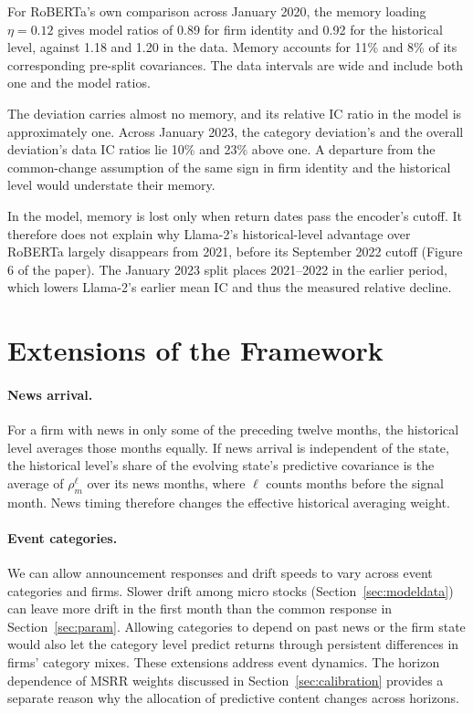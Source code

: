 \documentclass[11pt,letterpaper]{article}
\theoremstyle{remark}
\begin{document}
For RoBERTa's own comparison across January 2020, the memory loading $\eta=0.12$ gives model ratios of 0.89 for firm identity and 0.92 for the historical level, against 1.18 and 1.20 in the data. Memory accounts for 11\% and 8\% of its corresponding pre-split covariances. The data intervals are wide and include both one and the model ratios.

The deviation carries almost no memory, and its relative IC ratio in the model is approximately one. Across January 2023, the category deviation's and the overall deviation's data IC ratios lie 10\% and 23\% above one. A departure from the common-change assumption of the same sign in firm identity and the historical level would understate their memory.

In the model, memory is lost only when return dates pass the encoder's cutoff. It therefore does not explain why Llama-2's historical-level advantage over RoBERTa largely disappears from 2021, before its September 2022 cutoff (Figure 6 of the paper). The January 2023 split places 2021--2022 in the earlier period, which lowers Llama-2's earlier mean IC and thus the measured relative decline.

\section{Extensions of the Framework}\label{sec:extensions}

\paragraph{News arrival.}
For a firm with news in only some of the preceding twelve months, the historical level averages those months equally. If news arrival is independent of the state, the historical level's share of the evolving state's predictive covariance is the average of $\rho_m^\ell$ over its news months, where $\ell$ counts months before the signal month. News timing therefore changes the effective historical averaging weight.

\paragraph{Event categories.}
We can allow announcement responses and drift speeds to vary across event categories and firms. Slower drift among micro stocks (Section~\ref{sec:modeldata}) can leave more drift in the first month than the common response in Section~\ref{sec:param}. Allowing categories to depend on past news or the firm state would also let the category level predict returns through persistent differences in firms' category mixes. These extensions address event dynamics. The horizon dependence of MSRR weights discussed in Section~\ref{sec:calibration} provides a separate reason why the allocation of predictive content changes across horizons.
\end{document}
